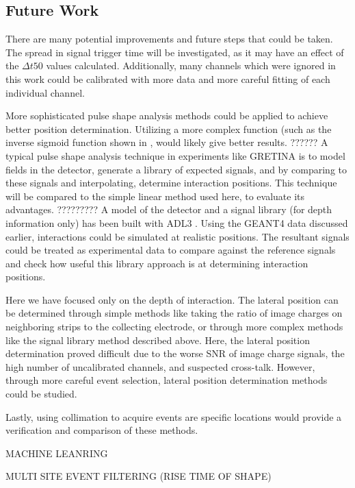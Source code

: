 \subsection*{Future Work}

There are many potential improvements and future steps that could be taken. The spread in signal trigger time will be investigated, as it may have an effect of the $\Delta t50$ values calculated. Additionally, many channels which were ignored in this work could be calibrated with more data and more careful fitting of each individual channel.

More sophisticated pulse shape analysis methods could be applied to achieve better position determination. Utilizing a more complex function (such as the inverse sigmoid function shown in \cite{cci21}, would likely give better results. 
??????
A typical pulse shape analysis technique in experiments like GRETINA is to model fields in the detector, generate a library of expected signals, and by comparing to these signals and interpolating, determine interaction positions. This technique will be compared to the simple linear method used here, to evaluate its advantages. 
?????????
 A model of the detector and a signal library (for depth information only) has been built with  ADL3 \cite{adl3}. Using the GEANT4 data discussed earlier, interactions could be simulated at realistic positions. The resultant signals could be treated as experimental data to compare against the reference signals and check how useful this library approach is at determining interaction positions.

Here we have focused only on the depth of interaction. The lateral position can be determined through simple methods like taking the ratio of image charges on neighboring strips to the collecting electrode, or through more complex methods like the signal library method described above. Here, the lateral position determination proved difficult due to the worse SNR of image charge signals, the high number of uncalibrated channels, and suspected cross-talk. However, through more careful event selection, lateral position determination methods could be studied.

Lastly, using collimation to acquire events are specific locations would provide a verification and comparison of these methods.

MACHINE LEANRING

MULTI SITE EVENT FILTERING (RISE TIME OF SHAPE)